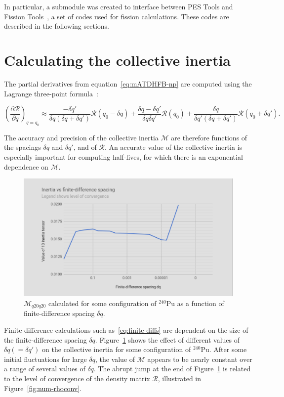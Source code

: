 In particular, a submodule was created to interface between PES Tools and Fission Tools~\cite{fission_tools}, a set of codes used for fission calculations. These codes are described in the following sections.

\section{Calculating the collective inertia}\label{sect:M_numerical}
The partial derivatives from equation~\eqref{eq:mATDHFB-np} are computed using the Lagrange three-point formula~\cite{Baran2011}:

\begin{equation}\label{eq:finite-diffs}
\left(\frac{\partial \mathcal{R}}{\partial q}\right)_{q=q_0} \approx 
    \frac{-\delta q'}{\delta q \left(\delta q + \delta q'\right)}\mathcal{R}(q_0-\delta q) + 
    \frac{\delta q - \delta q'}{\delta q \delta q'}\mathcal{R}(q_0) + 
    \frac{\delta q}{\delta q' \left(\delta q + \delta q'\right)}\mathcal{R}(q_0+\delta q') .
\end{equation}

\noindent The accuracy and precision of the collective inertia $\mathcal{M}$ are therefore functions of the spacings $\delta q$ and $\delta q'$, and of $\mathcal{R}$. An accurate value of the collective inertia is especially important for computing half-lives, for which there is an exponential dependence on $\mathcal{M}$.

\begin{figure}
	\centering
	\includegraphics[width=0.7\linewidth]{TeX_files/Num-dq_spacing}
	\caption[$\mathcal{M}_{q20q20}$ calculated for some configuration of $^{240}$Pu as a function of finite-difference spacing $\delta q$.]{$\mathcal{M}_{q20q20}$ calculated for some configuration of $^{240}$Pu as a function of finite-difference spacing $\delta q$.}
	\label{fig:num-dqspacing}
\end{figure}

Finite-difference calculations such as~\eqref{eq:finite-diffs} are dependent on the size of the finite-difference spacing $\delta q$. Figure~\ref{fig:num-dqspacing} shows the effect of different values of $\delta q (= \delta q')$ on the collective inertia for some configuration of $^{240}$Pu. After some initial fluctuations for large $\delta q$, the value of $\mathcal{M}$ appears to be nearly constant over a range of several values of $\delta q$. The abrupt jump at the end of Figure~\ref{fig:num-dqspacing} is related to the level of convergence of the density matrix $\mathcal{R}$, illustrated in Figure~\ref{fig:num-rhoconv}.

